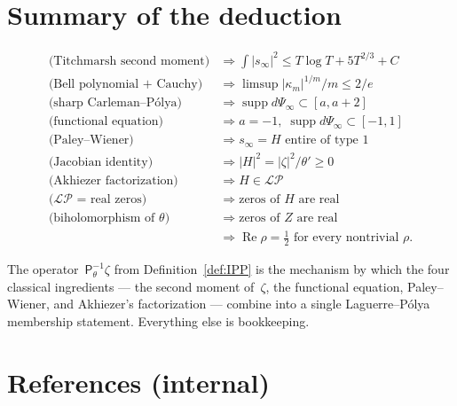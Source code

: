 \documentclass[11pt,a4paper]{article}
\theoremstyle{definition}
\DeclareMathOperator{\supp}{supp}
\DeclareMathOperator{\Real}{Re}
\newcommand{\ipp}{\mathsf{P}_\theta^{-1}}
\newcommand{\LP}{\mathcal{LP}}
\begin{document}
\section{Summary of the deduction}
\label{sec:summary}

\begin{align*}
\text{(Titchmarsh second moment)} &\Longrightarrow \textstyle\int|s_\infty|^2 \le T\log T + 5T^{2/3} + C\\
\text{(Bell polynomial + Cauchy)} &\Longrightarrow \limsup|\kappa_m|^{1/m}/m\le 2/e\\
\text{(sharp Carleman--P\'olya)} &\Longrightarrow \supp d\Psi_\infty\subset[a,a+2]\\
\text{(functional equation)} &\Longrightarrow a=-1,\;\supp d\Psi_\infty\subset[-1,1]\\
\text{(Paley--Wiener)} &\Longrightarrow s_\infty = H \text{ entire of type }1\\
\text{(Jacobian identity)} &\Longrightarrow |H|^2 = |\zeta|^2/\theta' \ge 0\\
\text{(Akhiezer factorization)} &\Longrightarrow H\in\LP\\
\text{($\LP$ = real zeros)} &\Longrightarrow \text{zeros of $H$ are real}\\
\text{(biholomorphism of $\theta$)} &\Longrightarrow \text{zeros of $Z$ are real}\\
 &\Longrightarrow \Real\rho = \tfrac12\text{ for every nontrivial }\rho.
\end{align*}

The operator~$\ipp\zeta$ from Definition~\ref{def:IPP} is the mechanism by which
the four classical ingredients --- the second moment of~$\zeta$, the functional
equation, Paley--Wiener, and Akhiezer's factorization --- combine into a single
Laguerre--P\'olya membership statement. Everything else is bookkeeping.

\section*{References (internal)}
\end{document}

